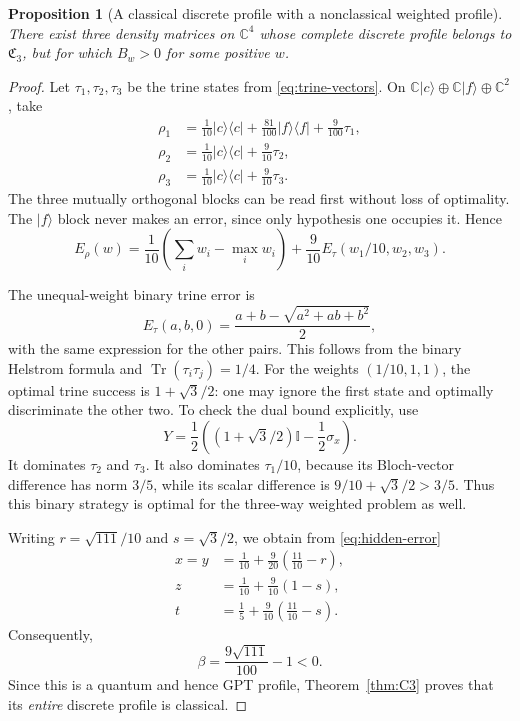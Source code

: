 \documentclass[10pt,a4paper]{amsart}
\newtheorem{proposition}[theorem]{Proposition}
\newcommand{\Tr}{\operatorname{Tr}}
\newcommand{\id}{\mathbb I}
\newcommand{\1}{\mathbf 1}
\newcommand{\Creg}{\mathfrak C}
\begin{document}
\begin{proposition}[A classical discrete profile with a nonclassical weighted profile]
\label{prop:hidden}
There exist three density matrices on $\mathbb C^4$ whose complete discrete
profile belongs to $\Creg_3$, but for which $B_w>0$ for some positive $w$.
\end{proposition}
\begin{proof}
Let $\tau_1,\tau_2,\tau_3$ be the trine states from
\eqref{eq:trine-vectors}. On
$\mathbb C|c\rangle\oplus\mathbb C|f\rangle\oplus\mathbb C^2$, take
\begin{align}
 \rho_1&=\frac1{10}|c\rangle\langle c|
       +\frac{81}{100}|f\rangle\langle f|+\frac9{100}\tau_1,
       \label{eq:hidden-states}\\
 \rho_2&=\frac1{10}|c\rangle\langle c|+\frac9{10}\tau_2,\nonumber\\
 \rho_3&=\frac1{10}|c\rangle\langle c|+\frac9{10}\tau_3.\nonumber
\end{align}
The three mutually orthogonal blocks can be read first without loss of
optimality. The $|f\rangle$ block never makes an error, since only hypothesis
one occupies it. Hence
\begin{equation}\label{eq:hidden-error}
 E_\rho(w)=\frac1{10}\left(\sum_iw_i-\max_iw_i\right)
       +\frac9{10}E_\tau(w_1/10,w_2,w_3).
\end{equation}

The unequal-weight binary trine error is
\begin{equation}\label{eq:binary-trine-weighted}
 E_\tau(a,b,0)=\frac{a+b-\sqrt{a^2+ab+b^2}}2,
\end{equation}
with the same expression for the other pairs. This follows from the binary
Helstrom formula and $\Tr(\tau_i\tau_j)=1/4$.
For the weights $(1/10,1,1)$, the optimal trine success is $1+\sqrt3/2$:
one may ignore the first state and optimally discriminate the other two.
To check the dual bound explicitly, use
\[
 Y=\frac12\left((1+\sqrt3/2)\id-\frac12\sigma_x\right).
\]
It dominates $\tau_2$ and $\tau_3$. It also dominates $\tau_1/10$, because its
Bloch-vector difference has norm $3/5$, while its scalar difference is
$9/10+\sqrt3/2>3/5$. Thus this binary strategy is optimal for the three-way
weighted problem as well.

Writing $r=\sqrt{111}/10$ and $s=\sqrt3/2$, we obtain from
\eqref{eq:hidden-error}
\begin{align}
 x=y&=\frac1{10}+\frac9{20}\left(\frac{11}{10}-r\right),\nonumber\\
 z&=\frac1{10}+\frac9{10}(1-s),\label{eq:hidden-profile}\\
 t&=\frac15+\frac9{10}\left(\frac{11}{10}-s\right).\nonumber
\end{align}
Consequently,
\begin{equation}\label{eq:hidden-discrete-beta}
 \beta=\frac{9\sqrt{111}}{100}-1<0.
\end{equation}
Since this is a quantum and hence GPT profile, Theorem~\ref{thm:C3} proves
that its \emph{entire} discrete profile is classical.


\end{proof}
\end{document}
